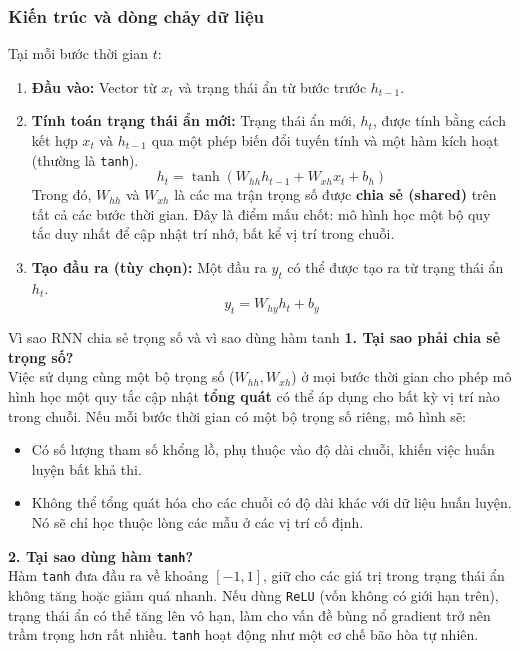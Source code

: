 \subsubsection{Kiến trúc và dòng chảy dữ liệu}
Tại mỗi bước thời gian $t$:
\begin{enumerate}
    \item \textbf{Đầu vào:} Vector từ $x_t$ và trạng thái ẩn từ bước trước $h_{t-1}$.
    \item \textbf{Tính toán trạng thái ẩn mới:} Trạng thái ẩn mới, $h_t$, được tính bằng cách kết hợp $x_t$ và $h_{t-1}$ qua một phép biến đổi tuyến tính và một hàm kích hoạt (thường là \texttt{tanh}).
        \begin{equation}
            h_t = \tanh(W_{hh} h_{t-1} + W_{xh} x_t + b_h)
        \end{equation}
        Trong đó, $W_{hh}$ và $W_{xh}$ là các ma trận trọng số được \textbf{chia sẻ (shared)} trên tất cả các bước thời gian. Đây là điểm mấu chốt: mô hình học một bộ quy tắc duy nhất để cập nhật trí nhớ, bất kể vị trí trong chuỗi.
    \item \textbf{Tạo đầu ra (tùy chọn):} Một đầu ra $y_t$ có thể được tạo ra từ trạng thái ẩn $h_t$.
        \begin{equation}
            y_t = W_{hy} h_t + b_y
        \end{equation}
\end{enumerate}
\begin{deepdive}{Vì sao RNN chia sẻ trọng số và vì sao dùng hàm tanh}
\textbf{1. Tại sao phải chia sẻ trọng số?} \\
Việc sử dụng cùng một bộ trọng số ($W_{hh}, W_{xh}$) ở mọi bước thời gian cho phép mô hình học một quy tắc cập nhật \textbf{tổng quát} có thể áp dụng cho bất kỳ vị trí nào trong chuỗi. Nếu mỗi bước thời gian có một bộ trọng số riêng, mô hình sẽ:
\begin{itemize}
    \item Có số lượng tham số khổng lồ, phụ thuộc vào độ dài chuỗi, khiến việc huấn luyện bất khả thi.
    \item Không thể tổng quát hóa cho các chuỗi có độ dài khác với dữ liệu huấn luyện. Nó sẽ chỉ học thuộc lòng các mẫu ở các vị trí cố định.
\end{itemize}

\textbf{2. Tại sao dùng hàm \texttt{tanh}?} \\
Hàm \texttt{tanh} đưa đầu ra về khoảng $[-1, 1]$, giữ cho các giá trị trong trạng thái ẩn không tăng hoặc giảm quá nhanh. Nếu dùng \texttt{ReLU} (vốn không có giới hạn trên), trạng thái ẩn có thể tăng lên vô hạn, làm cho vấn đề bùng nổ gradient trở nên trầm trọng hơn rất nhiều. \texttt{tanh} hoạt động như một cơ chế bão hòa tự nhiên.
\end{deepdive}

